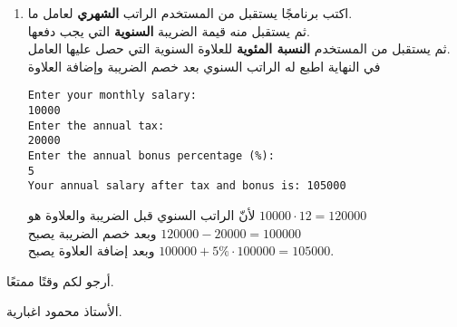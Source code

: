 \documentclass[12pt]{article}
\begin{document}
\begin{enumerate}
\clearpage
\item
اكتب برنامجًا يستقبل من المستخدم الراتب \textbf{الشهري} لعامل ما. \\
ثم يستقبل منه قيمة الضريبة \textbf{السنوية} التي يجب دفعها. \\
ثم يستقبل من المستخدم \textbf{النسبة المئوية} للعلاوة السنوية التي حصل عليها العامل. \\
في النهاية اطبع له الراتب السنوي بعد خصم الضريبة وإضافة العلاوة
\begin{example}
\begin{english}
\begin{lstlisting}
Enter your monthly salary:
10000
Enter the annual tax:
20000
Enter the annual bonus percentage (%):
5
Your annual salary after tax and bonus is: 105000
\end{lstlisting}
\end{english}
لأنّ الراتب السنوي قبل الضريبة والعلاوة هو $10000 \cdot 12 = 120000$ \\
وبعد خصم الضريبة يصبح $120000 - 20000 = 100000$ \\
وبعد إضافة العلاوة يصبح $100000 + 5\% \cdot 100000 = 105000$.
\end{example}

\end{enumerate}

\vspace{3cm}
\begin{flushleft}
أرجو لكم وقتًا ممتعًا.

الأستاذ محمود اغبارية.
\end{flushleft}
\end{document}
